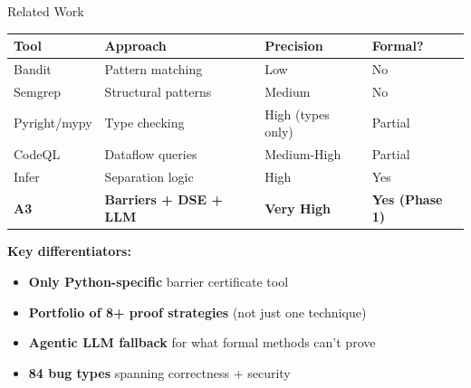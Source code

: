 \documentclass[aspectratio=169]{beamer}
\begin{document}
\begin{frame}{Related Work}

\begin{tabular}{llll}
\textbf{Tool} & \textbf{Approach} & \textbf{Precision} & \textbf{Formal?} \\
\hline
Bandit & Pattern matching & Low & No \\
Semgrep & Structural patterns & Medium & No \\
Pyright/mypy & Type checking & High (types only) & Partial \\
CodeQL & Dataflow queries & Medium-High & Partial \\
Infer & Separation logic & High & Yes \\
\textbf{A3} & \textbf{Barriers + DSE + LLM} & \textbf{Very High} & \textbf{Yes (Phase 1)} \\
\end{tabular}

\vspace{0.5em}
\textbf{Key differentiators:}
\begin{itemize}
  \item \textbf{Only Python-specific} barrier certificate tool
  \item \textbf{Portfolio of 8+ proof strategies} (not just one technique)
  \item \textbf{Agentic LLM fallback} for what formal methods can't prove
  \item \textbf{84 bug types} spanning correctness + security
\end{itemize}

\end{frame}
\end{document}
